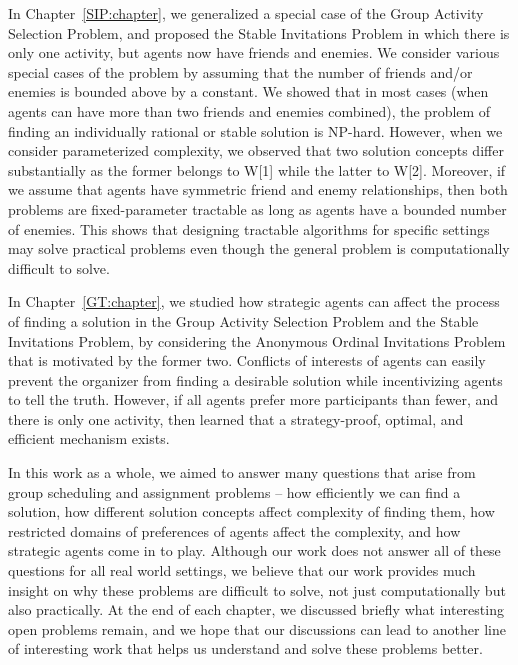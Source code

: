 In Chapter~\ref{SIP:chapter}, we generalized a special case of the Group Activity Selection Problem, and proposed the Stable Invitations Problem in which there is only one activity, but agents now have friends and enemies. We consider various special cases of the problem by assuming that the number of friends and/or enemies is bounded above by a constant. We showed that in most cases (when agents can have more than two friends and enemies combined), the problem of finding an individually rational or stable solution is NP-hard. However, when we consider parameterized complexity, we observed that two solution concepts differ substantially as the former belongs to W[1] while the latter to W[2]. Moreover, if we assume that agents have symmetric friend and enemy relationships, then both problems are fixed-parameter tractable as long as agents have a bounded number of enemies. This shows that designing tractable algorithms for specific settings may solve practical problems even though the general problem is computationally difficult to solve. 

In Chapter~\ref{GT:chapter}, we studied how strategic agents can affect the process of finding a solution in the Group Activity Selection Problem and the Stable Invitations Problem, by considering the Anonymous Ordinal Invitations Problem that is motivated by the former two. Conflicts of interests of agents can easily prevent the organizer from finding a desirable solution while incentivizing agents to tell the truth. However, if all agents prefer more participants than fewer, and there is only one activity, then learned that a strategy-proof, optimal, and efficient mechanism exists. 

In this work as a whole, we aimed to answer many questions that arise from group scheduling and assignment problems -- how efficiently we can find a solution, how different solution concepts affect complexity of finding them, how restricted domains of preferences of agents affect the complexity, and how strategic agents come in to play. Although our work does not answer all of these questions for all real world settings, we believe that our work provides much insight on why these problems are difficult to solve, not just computationally but also practically. At the end of each chapter, we discussed briefly what interesting open problems remain, and we hope that our discussions can lead to another line of interesting work that helps us understand and solve these problems better. 